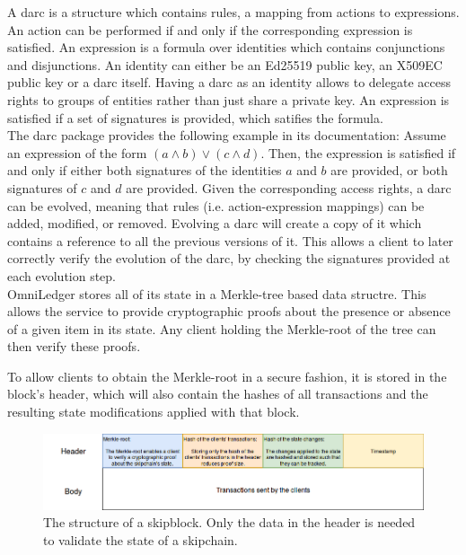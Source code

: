 \documentclass[11pt, a4paper, twoside, openright]{article} %
\begin{document}
A darc is a structure which contains rules, a mapping from actions
to expressions.
An action can be performed if and only if the corresponding expression is
satisfied. An expression is a formula over identities which
contains conjunctions and disjunctions. An identity can either be an Ed25519
public key, an X509EC public key or a darc itself.
Having a darc as an identity allows to delegate access rights to groups of
entities rather than just share a private key.
An expression is satisfied if a set of signatures is provided, which satifies
the formula.\\
The darc package provides the following example in its documentation:
Assume an expression of the form $(a \land b) \lor (c \land d)$.
Then, the expression is satisfied if and only if
either both signatures of the identities $a$ and $b$ are provided, or both
signatures of $c$ and $d$ are provided.
Given the corresponding access rights, a darc can be evolved, meaning that
rules (i.e. action-expression mappings) can be added, modified, or removed.
Evolving a darc will create a copy of it which contains a reference to all the
previous versions of it.
This allows a client to later correctly verify the evolution of the darc,
by checking the signatures provided at each evolution step.\\

OmniLedger stores all of its state in a Merkle-tree based data structre.
This allows the service to provide cryptographic proofs about the
presence or absence of a given item in its state. Any client holding the
Merkle-root of the tree can then verify these proofs.

To allow clients to obtain the Merkle-root in a secure fashion, it is stored in
the block's header, which will also contain the hashes of all transactions and
the resulting state modifications applied with that block.

\begin{figure}[htb!]
    \centering
    \includegraphics[scale=0.40]{block.png}
    \caption{The structure of a skipblock. Only the data in the header is
    needed to validate the state of a skipchain.}
    \label{f:block}
\end{figure}
\end{document}
